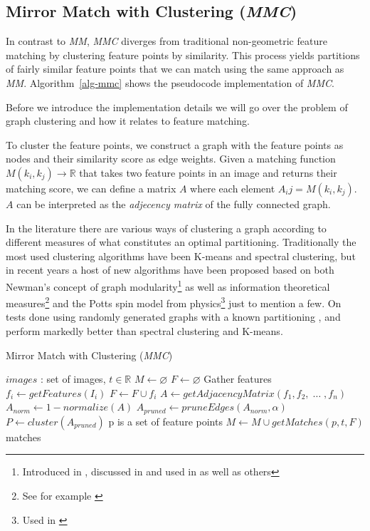 \subsection{Mirror Match with Clustering (\emph{MMC})}

In contrast to \emph{MM}, \emph{MMC} diverges from traditional 
non-geometric feature matching by clustering feature points by 
similarity. This process yields partitions of fairly similar feature 
points that we can match using the same approach as \emph{MM}.  
Algorithm~\ref{alg-mmc} shows the pseudocode implementation of \emph{MMC}.

Before we introduce the implementation details we will go over the 
problem of graph clustering and how it relates to feature matching.


To cluster the feature points, we construct a graph with the feature 
points as nodes and their similarity score as edge weights. Given a 
matching function $M(k_i, k_j) \rightarrow \mathbb{R}$ that takes two 
feature points in an image and returns their matching score, we can 
define a matrix $A$ where each element $A_ij = M(k_i, k_j)$. $A$ can be 
interpreted as the \emph{adjecency matrix} of the fully connected graph.  

In the literature there are various ways of clustering a graph according 
to different measures of what constitutes an optimal partitioning. 
Traditionally the most used clustering algorithms have been K-means and 
spectral clustering, but in recent years a host of new algorithms have 
been proposed based on both Newman's concept of graph 
modularity\footnote{Introduced in \cite{girvan2002}, discussed in 
\cite{brandes2007} and used in \cite{blondel2008} as well as others} as 
well as information theoretical measures\footnote{See for example 
\cite{rosvall2008}} and the Potts spin model from physics\footnote{Used 
in \cite{ronhovde2009}} just to mention a few. On tests done using 
randomly generated graphs with a known partitioning \cite{blondel2008}, 
\cite{rosvall2008} and \cite{ronhovde2009} perform markedly better than 
spectral clustering and K-means\cite{lancichinetti2009}.

\begin{algorithm}[htb]
\caption{Mirror Match with Clustering (\emph{MMC})}
\label{alg-mmc}
\begin{algorithmic}
\Require $images$ : set of images, $t \in \mathbb{R}$
\State $M\gets \varnothing$
\State $F\gets \varnothing$
 \Comment Gather features
	\State $f_i\gets getFeatures(I_i)$
	\State $F\gets F \cup f_i$
\EndFor
\State $A\gets getAdjacencyMatrix(f_1, f_2,\; \ldots \;, f_n)$
\State $A_{norm}\gets 1 - normalize(A)$
\State $A_{pruned}\gets pruneEdges(A_{norm},\alpha)$
\State $P\gets cluster(A_{pruned})$
 \Comment p is a set of feature points
	\State $M\gets M \cup getMatches(p, t, F)$
\EndFor \\
\Return matches
\end{algorithmic}
\end{algorithm}

